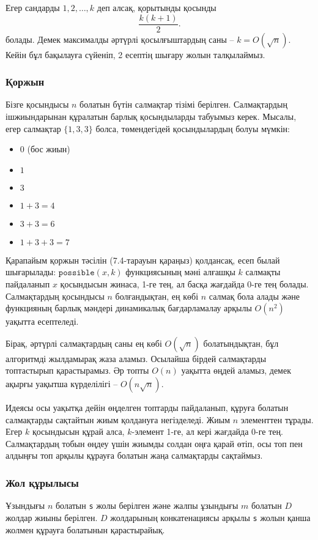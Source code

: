 Егер сандарды $1,2,\ldots,k$ деп алсақ,
қорытынды қосынды \[\frac{k(k+1)}{2}.\] болады. 
Демек максималды әртүрлі қосылғыштардың саны 
-- $k = O(\sqrt n)$. Кейін бұл бақылауға
сүйеніп, 2 есептің шығару жолын талқылаймыз. 

\subsubsection{Қоржын}

Бізге қосындысы $n$ болатын бүтін салмақтар тізімі берілген.
Салмақтардың ішжиындарынан құралатын барлық
қосындыларды табуымыз керек. Мысалы, егер салмақтар $\{1,3,3\}$ болса,
төмендегідей қосындылардың болуы мүмкін:

\begin{itemize}[noitemsep]
\item $0$ (бос жиын)
\item $1$
\item $3$
\item $1+3=4$
\item $3+3=6$
\item $1+3+3=7$
\end{itemize}

Қарапайым қоржын тәсілін (7.4-тарауын қараңыз) қолдансақ,
есеп былай шығарылады: 
$\texttt{possible}(x,k)$ функциясының мәні
алғашқы $k$ салмақты пайдаланып $x$ қосындысын жинаса, 1-ге тең, ал басқа жағдайда 0-ге тең болады. Салмақтардың
қосындысы $n$ болғандықтан, ең көбі $n$ салмақ бола алады
және функцияның барлық мәндері динамикалық бағдарламалау 
арқылы $O(n^2)$ уақытта есептеледі. 

Бірақ, әртүрлі салмақтардың саны ең
көбі $O(\sqrt n)$ болатындықтан, бұл 
алгоритмді жылдамырақ жаза аламыз.
Осылайша бірдей салмақтарды топтастырып
қарастырамыз. Әр топты $O(n)$ уақытта
өңдей аламыз, демек ақырғы уақытша күрделілігі --
$O(n \sqrt n)$. 

Идеясы осы уақытқа дейін өңделген топтарды пайдаланып,
құруға болатын салмақтарды сақтайтын жиым қолдануға негізделеді. 
Жиым $n$ элементтен тұрады. Егер $k$ қосындысын құрай
алса, $k$-элемент 1-ге, ал кері жағдайда 0-ге тең. 
Салмақтардың тобын өңдеу үшін жиымды солдан 
оңға қарай өтіп, осы топ пен алдыңғы топ арқылы 
құрауға болатын жаңа салмақтарды сақтаймыз. 

\subsubsection{Жол құрылысы}

Ұзындығы $n$ болатын \texttt{s} жолы берілген
және жалпы ұзындығы $m$ болатын $D$ жолдар жиыны берілген.
$D$ жолдарының конкатенациясы арқылы \texttt{s} жолын 
қанша жолмен құрауға болатынын қарастырайық. 

